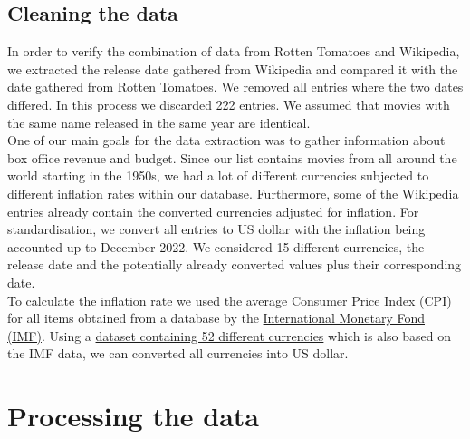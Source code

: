 \documentclass{article}
\begin{document}
\subsection{Cleaning the data}
    In order to verify the combination of data from Rotten Tomatoes and Wikipedia, we extracted the release date gathered from Wikipedia and compared it with the date gathered from Rotten Tomatoes. We removed all entries where the two dates differed. In this process we discarded 222 entries. We assumed that movies with the same name released in the same year are identical. \\
    One of our main goals for the data extraction was to gather information about box office revenue and budget. Since our list contains movies from all around the world starting in the 1950s, we had a lot of different currencies subjected to different inflation rates within our database. Furthermore, some of the Wikipedia entries already contain the converted currencies adjusted for inflation. For standardisation, we convert all entries to US dollar with the inflation being accounted up to December 2022. We considered 15 different currencies, the release date and the potentially already converted values plus their corresponding date.\\
    To calculate the inflation rate we used the average Consumer Price Index (CPI) for all items obtained from a database by the \href{https://data.imf.org/?sk=388dfa60-1d26-4ade-b505-a05a558d9a42}{International Monetary Fond (IMF)}. Using a \href{https://www.kaggle.com/datasets/thebasss/currency-exchange-rates}{dataset containing 52 different currencies} which is also based on the IMF data, we can converted all currencies into US dollar.


\section{Processing the data}
    
\end{document}
